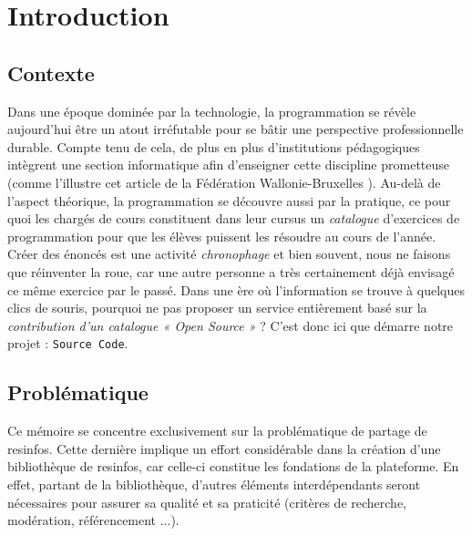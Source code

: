\chapter{Introduction}

\section*{Contexte}

Dans une époque dominée par la technologie, la programmation se révèle aujourd’hui être un atout irréfutable pour se bâtir une perspective professionnelle durable. Compte tenu de cela, de plus en plus d’institutions pédagogiques intègrent une section informatique afin d’enseigner cette discipline prometteuse (comme l'illustre cet article de la Fédération Wallonie-Bruxelles \cite{MAG_PROG}). Au-delà de l’aspect théorique, la programmation se découvre aussi par la pratique, ce pour quoi les chargés de cours constituent dans leur cursus un \textit{catalogue} d’exercices de programmation pour que les élèves puissent les résoudre au cours de l'année.\\

Créer des énoncés est une activité \textit{chronophage} et bien souvent, nous ne faisons que réinventer la roue, car une autre personne a très certainement déjà envisagé ce même exercice par le passé.
Dans une ère où l’information se trouve à quelques clics de souris, pourquoi ne pas proposer un service entièrement basé sur la \textit{contribution d’un catalogue « Open Source »} ? C’est donc ici que démarre notre projet : \texttt{Source Code}.\\

\section*{Problématique}

Ce mémoire se concentre exclusivement sur la problématique de partage de \glspl{resinfo}.
Cette dernière implique un effort considérable dans la création d'une bibliothèque de \glspl{resinfo}, car celle-ci constitue les fondations de la plateforme. En effet, partant de la bibliothèque, d'autres éléments interdépendants seront nécessaires pour assurer sa qualité et sa praticité (critères de recherche, modération, référencement ...).

